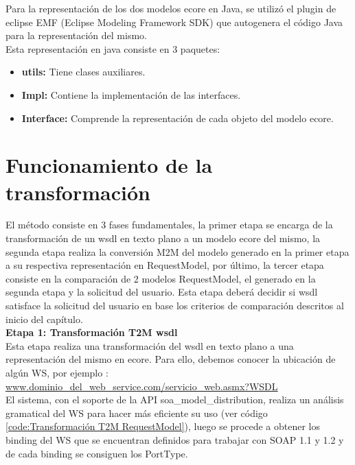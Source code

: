 Para la representación de los dos modelos ecore en Java,  se utilizó el plugin de eclipse EMF (Eclipse Modeling Framework SDK) que autogenera el código Java para la representación del mismo.\\
Esta representación en java consiste en 3 paquetes:

\begin{itemize}
	\item \textbf{utils:} Tiene clases auxiliares.
	\item \textbf{Impl:} Contiene la implementación de las interfaces.
	\item \textbf{Interface:} Comprende la representación de cada objeto del modelo ecore.
\end{itemize}

\section{Funcionamiento de la transformación}

El método consiste en 3 fases fundamentales, la primer etapa se encarga de la transformación de un wsdl en texto plano a un modelo ecore del mismo, la segunda etapa realiza la conversión M2M del modelo generado en la primer etapa a su respectiva representación en RequestModel, por último, la tercer etapa consiste en la comparación de 2 modelos RequestModel, el generado en la segunda etapa y la solicitud del usuario. Esta etapa deberá decidir si wsdl satisface la solicitud del usuario en base los criterios de comparación descritos al inicio del capítulo. \\


\textbf{Etapa 1: Transformación T2M wsdl}\\

Esta etapa realiza una transformación del wsdl en texto plano a una representación del mismo en ecore. Para ello, debemos conocer la ubicación de algún WS, por ejemplo : \url{www.dominio\_del\_web\_service.com/servicio\_web.asmx?WSDL}\\

El sistema, con el soporte de la API soa\_model\_distribution, realiza un análisis gramatical del WS para hacer más eficiente su uso (ver código \ref{code:Transformación T2M RequestModel}), luego se procede a obtener los binding del WS que se encuentran definidos para trabajar con SOAP 1.1 y 1.2 y de cada binding se consiguen los PortType.



